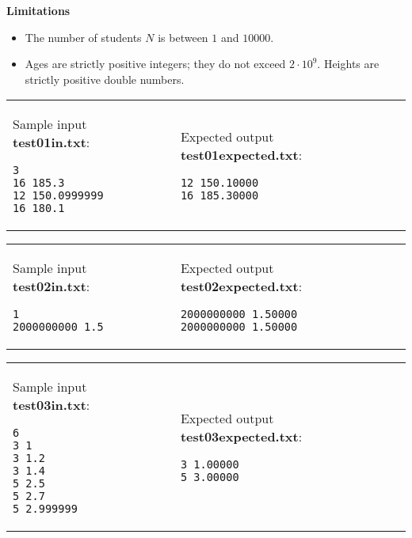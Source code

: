 \documentclass[11pt]{article}
\begin{document}
\vspace{10pt}
{\bf Limitations}

\begin{itemize}
\item The number of students $N$ is between $1$ and $10000$. 
\item Ages are strictly positive integers; they do not exceed $2 \cdot 10^9$.
Heights are strictly positive double numbers. 
\end{itemize}



\begin{tabular}{@{}ll@{}}
\begin{minipage}[t]{0.49\columnwidth}
Sample input {\bf test01in.txt}:
\begin{verbatim}
3
16 185.3
12 150.0999999
16 180.1
\end{verbatim}
\end{minipage} 
&
\begin{minipage}[t]{0.49\columnwidth}
Expected output {\bf test01expected.txt}:
\begin{verbatim}
12 150.10000
16 185.30000
\end{verbatim}
\end{minipage} 
\end{tabular}

\vspace{10pt}
\begin{tabular}{@{}ll@{}}
\begin{minipage}[t]{0.49\columnwidth}
Sample input {\bf test02in.txt}:
\begin{verbatim}
1
2000000000 1.5
\end{verbatim}
\end{minipage} 
&
\begin{minipage}[t]{0.49\columnwidth}
Expected output {\bf test02expected.txt}:
\begin{verbatim}
2000000000 1.50000
2000000000 1.50000
\end{verbatim}
\end{minipage} 
\end{tabular}

\vspace{10pt}
\begin{tabular}{@{}ll@{}}
\begin{minipage}[t]{0.49\columnwidth}
Sample input {\bf test03in.txt}:
\begin{verbatim}
6
3 1
3 1.2
3 1.4
5 2.5
5 2.7
5 2.999999
\end{verbatim}
\end{minipage} 
&
\begin{minipage}[t]{0.49\columnwidth}
Expected output {\bf test03expected.txt}:
\begin{verbatim}
3 1.00000
5 3.00000
\end{verbatim}
\end{minipage} 
\end{tabular}
\end{document}
